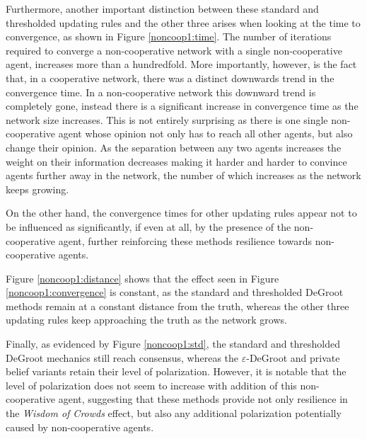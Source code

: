 \documentclass[a4paper, 12pt]{report}
\begin{document}
\noindent Furthermore, another important distinction between these standard and thresholded updating rules and the other three arises when looking at the time to convergence, as shown in Figure \ref{noncoop1:time}. The number of iterations required to converge a non-cooperative network with a single non-cooperative agent, increases more than a hundredfold. More importantly, however, is the fact that, in a cooperative network, there was a distinct downwards trend in the convergence time. In a non-cooperative network this downward trend is completely gone, instead there is a significant increase in convergence time as the network size increases. This is not entirely surprising as there is one single non-cooperative agent whose opinion not only has to reach all other agents, but also change their opinion. As the separation between any two agents increases the weight on their information decreases making it harder and harder to convince agents further away in the network, the number of which increases as the network keeps growing.

\noindent On the other hand, the convergence times for other updating rules appear not to be influenced as significantly, if even at all, by the presence of the non-cooperative agent, further reinforcing these methods resilience towards non-cooperative agents.

\noindent Figure \ref{noncoop1:distance} shows that the effect seen in Figure \ref{noncoop1:convergence} is constant, as the standard and thresholded DeGroot methods remain at a constant distance from the truth, whereas the other three updating rules keep approaching the truth as the network grows.

\noindent Finally, as evidenced by Figure \ref{noncoop1:std}, the standard and thresholded DeGroot mechanics still reach consensus, whereas the $\varepsilon$-DeGroot and private belief variants retain their level of polarization. However, it is notable that the level of polarization does not seem to increase with addition of this non-cooperative agent, suggesting that these methods provide not only resilience in the \emph{Wisdom of Crowds} effect, but also any additional polarization potentially caused by non-cooperative agents.
\end{document}
